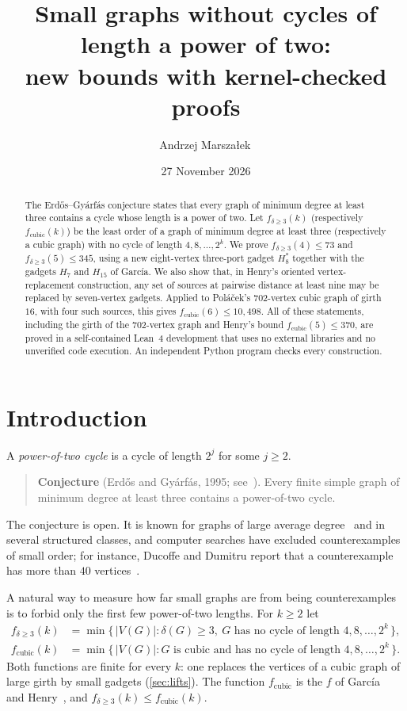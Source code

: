 \documentclass[11pt]{amsart}
\title[Small graphs without power-of-two cycles]{Small graphs without cycles of length a power of two:\\ new bounds with kernel-checked proofs}
\author[A. Marszałek]{Andrzej Marszałek\,\orcidlink{0009-0006-6148-2965}}
\date{27 November 2026}
\theoremstyle{definition}
\theoremstyle{remark}
\newcommand{\fd}{f_{\delta\ge 3}}
\newcommand{\fc}{f_{\mathrm{cubic}}}
\newcommand{\Hseven}{H_7}
\newcommand{\Hfifteen}{H_{15}}
\newcommand{\Height}{H_8^{*}}
\begin{document}
\begin{abstract}
The Erdős–Gyárfás conjecture states that every graph of minimum degree at least
three contains a cycle whose length is a power of two. Let $\fd(k)$ (respectively
$\fc(k)$) be the least order of a graph of minimum degree at least three
(respectively a cubic graph) with no cycle of length $4,8,\dots,2^k$. We prove
$\fd(4)\le 73$ and $\fd(5)\le 345$, using a new eight-vertex three-port gadget
$\Height$ together with the gadgets $\Hseven$ and $\Hfifteen$ of García. We also
show that, in Henry's oriented vertex-replacement construction, any set of
sources at pairwise distance at least nine may be replaced by seven-vertex
gadgets. Applied to Poláček's $702$-vertex cubic graph of girth $16$, with four
such sources, this gives $\fc(6)\le 10{,}498$. All of these statements,
including the girth of the $702$-vertex graph and Henry's bound
$\fc(5)\le 370$, are proved in a self-contained Lean~4 development that uses no
external libraries and no unverified code execution. An independent Python
program checks every construction.
\end{abstract}

\maketitle

\section{Introduction}

A \emph{power-of-two cycle} is a cycle of length $2^j$ for some $j\ge 2$.

\begin{quote}
\textbf{Conjecture} (Erdős and Gyárfás, 1995; see~\cite{Erdos1997}).
Every finite simple graph of minimum degree at least three contains a
power-of-two cycle.
\end{quote}

The conjecture is open. It is known for graphs of large average
degree~\cite{LiuMontgomery2023} and in several structured classes, and
computer searches have excluded counterexamples of small order; for instance,
Ducoffe and Dumitru report that a counterexample has more than $40$
vertices~\cite{DucoffeDumitru2026}.

A natural way to measure how far small graphs are from being counterexamples
is to forbid only the first few power-of-two lengths. For $k\ge 2$ let
\begin{align*}
  \fd(k) &= \min\{\,|V(G)| : \delta(G)\ge 3,\ G \text{ has no cycle of length } 4,8,\dots,2^k\,\},\\
  \fc(k) &= \min\{\,|V(G)| : G \text{ is cubic and has no cycle of length } 4,8,\dots,2^k\,\}.
\end{align*}
Both functions are finite for every $k$: one replaces the vertices of a cubic
graph of large girth by small gadgets (\cref{sec:lifts}). The function $\fc$ is
the $f$ of García~\cite{Garcia2026} and Henry~\cite{Henry2026}, and
$\fd(k)\le\fc(k)$.
\end{document}
